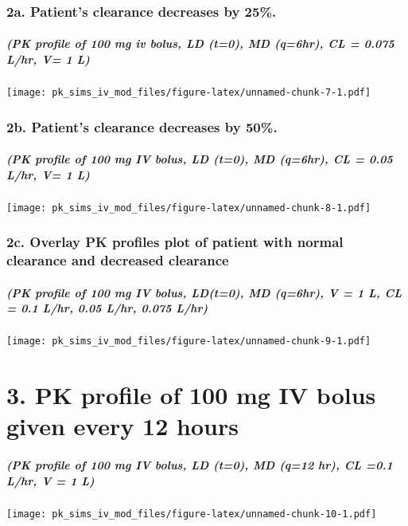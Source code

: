 \documentclass[]{article}
\begin{document}
\subsubsection{2a. Patient's clearance decreases by
25\%.}\label{a.-patients-clearance-decreases-by-25.-1}

\subparagraph{(PK profile of 100 mg iv bolus, LD (t=0), MD (q=6hr), CL =
0.075 L/hr, V= 1
L)}\label{pk-profile-of-100-mg-iv-bolus-ld-t0-md-q6hr-cl-0.075-lhr-v-1-l}

\texttt{[image: pk\_sims\_iv\_mod\_files/figure-latex/unnamed-chunk-7-1.pdf]}

\subsubsection{2b. Patient's clearance decreases by
50\%.}\label{b.-patients-clearance-decreases-by-50.-1}

\subparagraph{(PK profile of 100 mg IV bolus, LD (t=0), MD (q=6hr), CL =
0.05 L/hr, V= 1
L)}\label{pk-profile-of-100-mg-iv-bolus-ld-t0-md-q6hr-cl-0.05-lhr-v-1-l}

\texttt{[image: pk\_sims\_iv\_mod\_files/figure-latex/unnamed-chunk-8-1.pdf]}

\subsubsection{2c. Overlay PK profiles plot of patient with normal
clearance and decreased
clearance}\label{c.-overlay-pk-profiles-plot-of-patient-with-normal-clearance-and-decreased-clearance}

\subparagraph{(PK profile of 100 mg IV bolus, LD(t=0), MD (q=6hr), V = 1
L, CL = 0.1 L/hr, 0.05 L/hr, 0.075
L/hr)}\label{pk-profile-of-100-mg-iv-bolus-ldt0-md-q6hr-v-1-l-cl-0.1-lhr-0.05-lhr-0.075-lhr}

\texttt{[image: pk\_sims\_iv\_mod\_files/figure-latex/unnamed-chunk-9-1.pdf]}

\section{3. PK profile of 100 mg IV bolus given every 12
hours}\label{pk-profile-of-100-mg-iv-bolus-given-every-12-hours}

\subparagraph{(PK profile of 100 mg IV bolus, LD (t=0), MD (q=12 hr), CL
=0.1 L/hr, V = 1
L)}\label{pk-profile-of-100-mg-iv-bolus-ld-t0-md-q12-hr-cl-0.1-lhr-v-1-l}

\texttt{[image: pk\_sims\_iv\_mod\_files/figure-latex/unnamed-chunk-10-1.pdf]}
\end{document}
